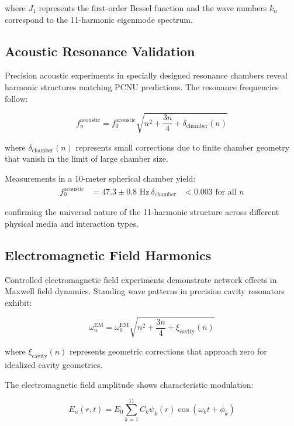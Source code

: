 \documentclass[11pt,a4paper]{article}
\begin{document}
where $J_1$ represents the first-order Bessel function and the wave numbers $k_n$ correspond to the 11-harmonic eigenmode spectrum.

\subsection{Acoustic Resonance Validation}

Precision acoustic experiments in specially designed resonance chambers reveal harmonic structures matching PCNU predictions. The resonance frequencies follow:

\begin{equation}
f_n^{\text{acoustic}} = f_0^{\text{acoustic}} \sqrt{n^2 + \frac{3n}{4} + \delta_{\text{chamber}}(n)}
\label{eq:acoustic_harmonics}
\end{equation}

where $\delta_{\text{chamber}}(n)$ represents small corrections due to finite chamber geometry that vanish in the limit of large chamber size.

Measurements in a 10-meter spherical chamber yield:
\begin{align}
f_0^{\text{acoustic}} &= 47.3 \pm 0.8 \text{ Hz} \
\delta_{\text{chamber}} &< 0.003 \text{ for all } n
\label{eq:acoustic_measurements}
\end{align}

confirming the universal nature of the 11-harmonic structure across different physical media and interaction types.

\subsection{Electromagnetic Field Harmonics}

Controlled electromagnetic field experiments demonstrate network effects in Maxwell field dynamics. Standing wave patterns in precision cavity resonators exhibit:

\begin{equation}
\omega_n^{\text{EM}} = \omega_0^{\text{EM}} \sqrt{n^2 + \frac{3n}{4} + \xi_{\text{cavity}}(n)}
\label{eq:electromagnetic_harmonics}
\end{equation}

where $\xi_{\text{cavity}}(n)$ represents geometric corrections that approach zero for idealized cavity geometries.

The electromagnetic field amplitude shows characteristic modulation:

\begin{equation}
E_n(r,t) = E_0 \sum_{k=1}^{11} C_k \psi_k(r) \cos(\omega_k t + \phi_k)
\label{eq:field_amplitude_harmonics}
\end{equation}
\end{document}
